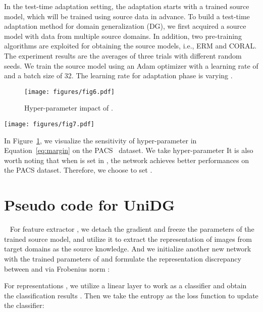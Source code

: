 \documentclass{article} \usepackage{iclr2024_conference,times}
\def\Model{UniDG }
\begin{document}
In the test-time adaptation setting, the adaptation starts with a trained source model, which will be trained using source data in advance. To build a test-time adaptation method for domain generalization (DG), we first acquired a source model with data from multiple source domains. In addition, two pre-training algorithms are exploited for obtaining the source models, i.e., ERM and CORAL. The experiment results are the averages of three trials with different random seeds. We train the source model using an Adam optimizer with a learning rate of  and a batch size of 32. The learning rate for adaptation phase is varying .

\begin{figure}[t]
	\centering
	\texttt{[image: figures/fig6.pdf]}
	\caption{Hyper-parameter impact of .}
	\label{fig:hyer}
\end{figure}

\begin{figure*}[t]
	\centering
	\texttt{[image: figures/fig7.pdf]}
	\caption{Qualitative Results of \Model on challenging TerraIncognita~\cite{beery2018recognition} dataset. \Model (4th column) aggregates intra-class feature embeddings better with the pretrained ERM model (1st column) compared with advanced methods including TENT~\cite{wang2020tent} (2nd column), and TAST~\cite{jang2022test} (3rd column).}
	\label{fig:vis-tsne}
\end{figure*}
In Figure~\ref{fig:hyer}, we visualize the sensitivity of hyper-parameter  in Equation~\ref{eq:margin} on the PACS~\cite{torralba2011unbiased} dataset. We take hyper-parameter  It is also worth noting that when  is set in , the network achieves better performances on the PACS dataset. Therefore, we choose to set .
\section{Pseudo code for \Model} ~\label{sec:pseu}
For feature extractor , we detach the gradient and freeze the parameters of the trained source model, and utilize it to extract the representation of images from target domains as the source knowledge. And we initialize another new network  with the trained parameters of  and formulate the representation discrepancy between  and  via Frobenius norm :

For representations , we utilize a linear layer to work as a classifier and obtain the classification results . Then we take the  entropy as the loss function to update the classifier:
\end{document}
